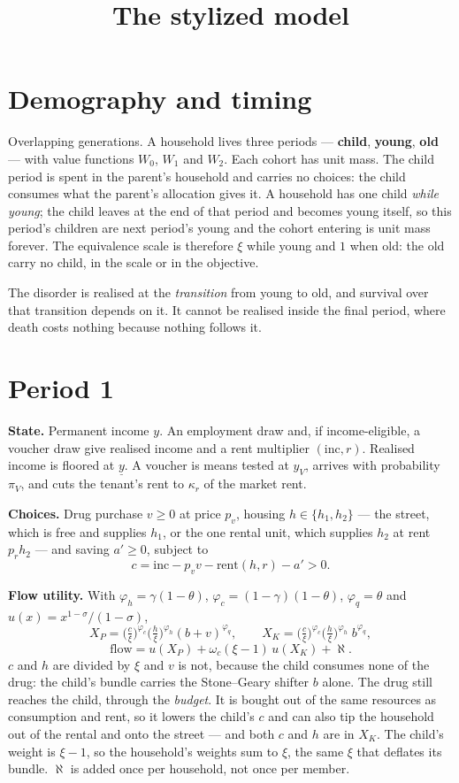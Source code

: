 \documentclass[11pt]{article}
\title{\vspace{-1.3cm}\textbf{The stylized model}}
\author{}\date{}
\begin{document}
\maketitle\vspace{-3.2em}

\section*{Demography and timing}
Overlapping generations. A household lives three periods --- \textbf{child},
\textbf{young}, \textbf{old} --- with value functions $W_0$, $W_1$ and $W_2$. Each
cohort has unit mass. The child period is spent in the parent's household and
carries no choices: the child consumes what the parent's allocation gives it.
A household has one child \emph{while young}; the child leaves at the end of that
period and becomes young itself, so this period's children are next period's
young and the cohort entering is unit mass forever. The equivalence scale is
therefore $\xi$ while young and $1$ when old: the old carry no child, in the
scale or in the objective.

The disorder is realised at the \emph{transition} from young to old, and survival
over that transition depends on it. It cannot be realised inside the final
period, where death costs nothing because nothing follows it.

\section*{Period 1}
\textbf{State.} Permanent income $y$. An employment draw and, if income-eligible,
a voucher draw give realised income and a rent multiplier $(\text{inc},r)$.
Realised income is floored at $\underline y$. A voucher is means tested at $y_V$,
arrives with probability $\pi_V$, and cuts the tenant's rent to $\kappa_r$ of the
market rent.

\textbf{Choices.} Drug purchase $v\ge0$ at price $p_v$, housing
$h\in\{h_1,h_2\}$ --- the street, which is free and supplies $h_1$, or the one
rental unit, which supplies $h_2$ at rent $p_r h_2$ --- and saving $a'\ge0$,
subject to
\[
  c=\text{inc}-p_v v-\text{rent}(h,r)-a'>0 .
\]

\textbf{Flow utility.} With $\varphi_h=\gamma(1-\theta)$,
$\varphi_c=(1-\gamma)(1-\theta)$, $\varphi_q=\theta$ and
$u(x)=x^{1-\sigma}/(1-\sigma)$,
\[
  X_P=\Big(\tfrac{c}{\xi}\Big)^{\varphi_c}\Big(\tfrac{h}{\xi}\Big)^{\varphi_h}(b+v)^{\varphi_q},
  \qquad
  X_K=\Big(\tfrac{c}{\xi}\Big)^{\varphi_c}\Big(\tfrac{h}{\xi}\Big)^{\varphi_h}\;b^{\varphi_q},
\]
\[
  \text{flow}=u(X_P)+\omega_c(\xi-1)\,u(X_K)+\aleph .
\]
$c$ and $h$ are divided by $\xi$ and $v$ is not, because the child consumes none
of the drug: the child's bundle carries the Stone--Geary shifter $b$ alone.
The drug still reaches the child, through the \emph{budget}. It is bought out of
the same resources as consumption and rent, so it lowers the child's $c$ and can
also tip the household out of the rental and onto the street --- and both $c$ and
$h$ are in $X_K$. The child's weight is $\xi-1$, so the household's weights sum
to $\xi$, the same $\xi$ that deflates its bundle. $\aleph$ is added once per
household, not once per member.
\end{document}
